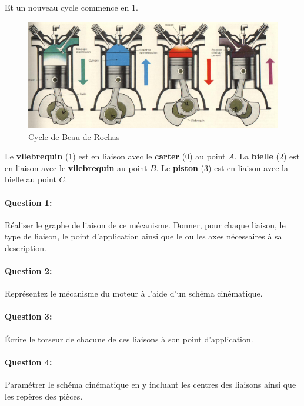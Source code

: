 Et un nouveau cycle commence en 1.

\begin{figure}[htbp]
\begin{center}
 \includegraphics[width=\linewidth]{img/cycles.jpg}
\caption{Cycle de Beau de Rochas}
\label{fig:image9}
\end{center}
\end{figure}

Le \textbf{vilebrequin} (1) est en liaison avec le \textbf{carter} (0) au point $A$. La \textbf{bielle} (2) est en liaison avec le \textbf{vilebrequin} au point $B$. Le \textbf{piston} (3) est en liaison avec la bielle au point $C$.

\paragraph{Question 1:} Réaliser le graphe de liaison de ce mécanisme. Donner, pour chaque liaison, le type de liaison, le point d'application ainsi que le ou les axes nécessaires à sa description.

\paragraph{Question 2:} Représentez le mécanisme du moteur à l'aide d'un schéma cinématique.

\paragraph{Question 3:} Écrire le torseur de chacune de ces liaisons à son point d'application.

\paragraph{Question 4:} Paramétrer le schéma cinématique en y incluant les centres des liaisons ainsi que les repères des pièces.

